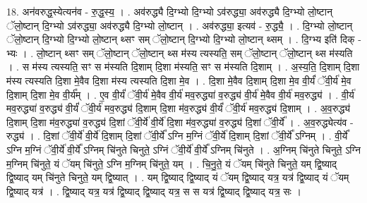 \documentclass[17pt]{extarticle}
\begin{document}
18. अन॑वरुद्ध॒स्येत्यन॑व - रु॒द्ध॒स्य॒ । . अव॑रुद्ध्यै दि॒ग्भ्यो दि॒ग्भ्यो ऽव॑रुद्ध्या॒ अव॑रुद्ध्यै दि॒ग्भ्यो लो॒ष्टान् ॅलो॒ष्टान् दि॒ग्भ्यो ऽव॑रुद्ध्या॒ अव॑रुद्ध्यै दि॒ग्भ्यो लो॒ष्टान् । . अव॑रुद्ध्या॒ इत्यव॑ - रु॒द्ध्यै॒ । . दि॒ग्भ्यो लो॒ष्टान् ॅलो॒ष्टान् दि॒ग्भ्यो दि॒ग्भ्यो लो॒ष्टान् थ्सꣳ सम् ॅलो॒ष्टान् दि॒ग्भ्यो दि॒ग्भ्यो लो॒ष्टान् थ्सम् । . दि॒ग्भ्य इति॑ दिक् - भ्यः । . लो॒ष्टान् थ्सꣳ सम् ॅलो॒ष्टान् ॅलो॒ष्टान् थ्स म॑स्य त्यस्यति॒ सम् ॅलो॒ष्टान् ॅलो॒ष्टान् थ्स म॑स्यति । . स म॑स्य त्यस्यति॒ सꣳ स म॑स्यति दि॒शाम् दि॒शा म॑स्यति॒ सꣳ स म॑स्यति दि॒शाम् । . अ॒स्य॒ति॒ दि॒शाम् दि॒शा म॑स्य त्यस्यति दि॒शा मे॒वैव दि॒शा म॑स्य त्यस्यति दि॒शा मे॒व । . दि॒शा मे॒वैव दि॒शाम् दि॒शा मे॒व वी॒र्यं॑ ॅवी॒र्य॑ मे॒व दि॒शाम् दि॒शा मे॒व वी॒र्य᳚म् । . ए॒व वी॒र्यं॑ ॅवी॒र्य॑ मे॒वैव वी॒र्य॑ मव॒रुद्ध्या॑ व॒रुद्ध्य॑ वी॒र्य॑ मे॒वैव वी॒र्य॑ मव॒रुद्ध्य॑ । . वी॒र्य॑ मव॒रुद्ध्या॑ व॒रुद्ध्य॑ वी॒र्यं॑ ॅवी॒र्य॑ मव॒रुद्ध्य॑ दि॒शाम् दि॒शा म॑व॒रुद्ध्य॑ वी॒र्यं॑ ॅवी॒र्य॑ मव॒रुद्ध्य॑ दि॒शाम् । . अ॒व॒रुद्ध्य॑ दि॒शाम् दि॒शा म॑व॒रुद्ध्या॑ व॒रुद्ध्य॑ दि॒शां ॅवी॒र्ये॑ वी॒र्ये॑ दि॒शा म॑व॒रुद्ध्या॑ व॒रुद्ध्य॑ दि॒शां ॅवी॒र्ये᳚ । . अ॒व॒रुद्ध्येत्य॑व - रुद्ध्य॑ । . दि॒शां ॅवी॒र्ये॑ वी॒र्ये॑ दि॒शाम् दि॒शां ॅवी॒र्ये᳚ ऽग्नि म॒ग्निं ॅवी॒र्ये॑ दि॒शाम् दि॒शां ॅवी॒र्ये᳚ ऽग्निम् । . वी॒र्ये᳚ ऽग्नि म॒ग्निं ॅवी॒र्ये॑ वी॒र्ये᳚ ऽग्निम् चि॑नुते चिनुते॒ ऽग्निं ॅवी॒र्ये॑ वी॒र्ये᳚ ऽग्निम् चि॑नुते । . अ॒ग्निम् चि॑नुते चिनुते॒ ऽग्नि म॒ग्निम् चि॑नुते॒ यं ॅयम् चि॑नुते॒ ऽग्नि म॒ग्निम् चि॑नुते॒ यम् । . चि॒नु॒ते॒ यं ॅयम् चि॑नुते चिनुते॒ यम् द्वि॒ष्याद् द्वि॒ष्याद् यम् चि॑नुते चिनुते॒ यम् द्वि॒ष्यात् । . यम् द्वि॒ष्याद् द्वि॒ष्याद् यं ॅयम् द्वि॒ष्याद् यत्र॒ यत्र॑ द्वि॒ष्याद् यं ॅयम् द्वि॒ष्याद् यत्र॑ । . द्वि॒ष्याद् यत्र॒ यत्र॑ द्वि॒ष्याद् द्वि॒ष्याद् यत्र॒ स स यत्र॑ द्वि॒ष्याद् द्वि॒ष्याद् यत्र॒ सः । \newline
\end{document}
